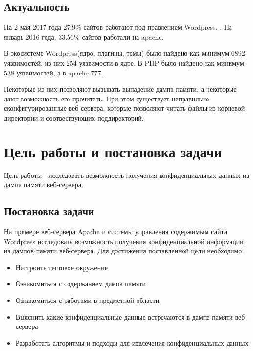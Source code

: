 \documentclass[20pt]{article}
\begin{document}
\subsection{Актуальность}

На 2 мая 2017 года 27.9\% сайтов работают под правлением Wordpress.
\cite{number_of_wordpress_sites}. На январь 2016 года, 33.56\% сайтов работали
на apache\cite{number_of_apache_sites}.

В экосистеме Wordpress(ядро, плагины, темы) было найдено как минимум 6892
уязвимостей\cite{wordpress/vulnerablilities-list-all}, из них 254
уязвимости\cite{wordpress/vulnerabilities-list-core} в ядре. В PHP было
найдено как минимум 538\cite{php/vulnerabilities-list} уязвимостей, а в apache
777\cite{apache/vulnerabilities-list}.

Некоторые из них позволяют вызывать выпадение дампа памяти, а некоторые дают
возможность его прочитать. При этом существует неправильно сконфигурированные
веб-сервера, которые позволяют читать файлы из корневой директории и
соотвествующих поддиректорий.

\newpage

\section{Цель работы и постановка задачи}

Цель работы - исследовать возможность получения конфиденциальных данных из
дампа памяти веб-сервера.

\subsection{Постановка задачи}

На примере веб-сервера Apache и системы управления содержимым сайта Wordpress
исследовать возможность получения конфиденциальной информации из дампов памяти
веб-сервера. Для достижения поставленной цели необходимо:

\begin{itemize}
  \item Настроить тестовое окружение
  \item Ознакомиться с содержанием дампа памяти
  \item Ознакомиться с работами в предметной области
  \item Выяснить какие конфиденциальные данные встречаются в дампе памяти веб-сервера
  \item Разработать алгоритмы и подходы для извлечения конфиденциальных данных
\end{itemize}
\end{document}
